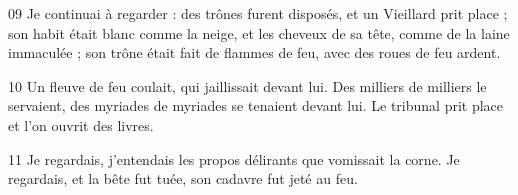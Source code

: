 09 Je continuai à regarder : des trônes furent disposés, et un Vieillard prit place ; son habit était blanc comme la neige, et les cheveux de sa tête, comme de la laine immaculée ; son trône était fait de flammes de feu, avec des roues de feu ardent.

10 Un fleuve de feu coulait, qui jaillissait devant lui. Des milliers de milliers le servaient, des myriades de myriades se tenaient devant lui. Le tribunal prit place et l’on ouvrit des livres.

11 Je regardais, j’entendais les propos délirants que vomissait la corne. Je regardais, et la bête fut tuée, son cadavre fut jeté au feu.